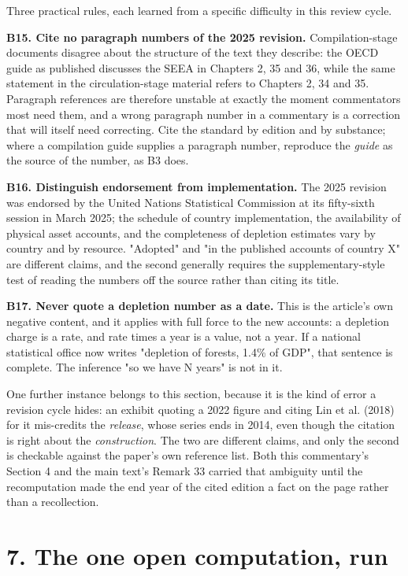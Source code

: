 \documentclass[11pt]{article}
\begin{document}
Three practical rules, each learned from a specific difficulty in this review cycle.

\textbf{B15. Cite no paragraph numbers of the 2025 revision.} Compilation-stage documents disagree about the structure of the text they describe: the OECD guide as published discusses the SEEA in Chapters 2, 35 and 36, while the same statement in the circulation-stage material refers to Chapters 2, 34 and 35. Paragraph references are therefore unstable at exactly the moment commentators most need them, and a wrong paragraph number in a commentary is a correction that will itself need correcting. Cite the standard by edition and by substance; where a compilation guide supplies a paragraph number, reproduce the \emph{guide} as the source of the number, as B3 does.

\textbf{B16. Distinguish endorsement from implementation.} The 2025 revision was endorsed by the United Nations Statistical Commission at its fifty-sixth session in March 2025; the schedule of country implementation, the availability of physical asset accounts, and the completeness of depletion estimates vary by country and by resource. "Adopted" and "in the published accounts of country X" are different claims, and the second generally requires the supplementary-style test of reading the numbers off the source rather than citing its title.

\textbf{B17. Never quote a depletion number as a date.} This is the article's own negative content, and it applies with full force to the new accounts: a depletion charge is a rate, and rate times a year is a value, not a year. If a national statistical office now writes "depletion of forests, 1.4\% of GDP", that sentence is complete. The inference "so we have N years" is not in it.

One further instance belongs to this section, because it is the kind of error a revision cycle hides: an exhibit quoting a 2022 figure and citing Lin et al. (2018) for it mis-credits the \emph{release}, whose series ends in 2014, even though the citation is right about the \emph{construction}. The two are different claims, and only the second is checkable against the paper's own reference list. Both this commentary's Section 4 and the main text's Remark 33 carried that ambiguity until the recomputation made the end year of the cited edition a fact on the page rather than a recollection.

\vspace{0.8em}

\section*{7. The one open computation, run}\label{7-the-one-open-computation-run}
\end{document}
